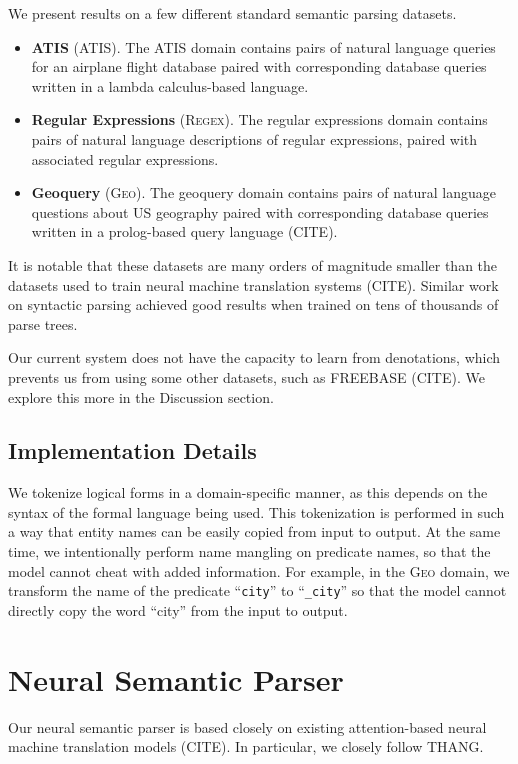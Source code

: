 \documentclass[11pt,letterpaper]{article}
\newcommand{\atis}{\textsc{ATIS}\xspace}
\newcommand{\regex}{\textsc{Regex}\xspace}
\newcommand{\geo}{\textsc{Geo}\xspace}
\begin{document}
We present results on a few different standard semantic parsing datasets.

\begin{itemize}
  \item \textbf{ATIS} (\atis).  The ATIS domain contains pairs of
    natural language queries for an airplane flight database
    paired with corresponding database queries written in a 
    lambda calculus-based language.

  \item \textbf{Regular Expressions} (\regex).  The regular expressions domain
contains pairs of natural language descriptions of regular expressions,
paired with associated regular expressions.

  \item \textbf{Geoquery} (\geo).  The geoquery domain
contains pairs of natural language questions about US geography
paired with corresponding database queries written in a prolog-based
query language (CITE).
\end{itemize}

It is notable that these datasets are many orders of magnitude smaller
than the datasets used to train neural machine translation systems (CITE).
Similar work on syntactic parsing achieved good results
when trained on tens of thousands of parse trees.

Our current system does not have the capacity to learn from denotations,
which prevents us from using some other datasets,
such as FREEBASE (CITE).
We explore this more in the Discussion section.

\subsection{Implementation Details}
We tokenize logical forms in a domain-specific manner,
as this depends on the syntax of the formal language being used.
This tokenization is performed in such a way that
entity names can be easily copied from input to output.
At the same time, we intentionally perform name mangling on predicate names,
so that the model cannot cheat with added information.
For example, in the \geo domain, we transform the name
of the predicate ``\texttt{city}'' to ``\texttt{\_city}''
so that the model cannot directly copy the word ``city'' from the input 
to output.

\section{Neural Semantic Parser}
Our neural semantic parser is based closely on existing
attention-based neural machine translation models (CITE).
In particular, we closely follow THANG.
\end{document}
